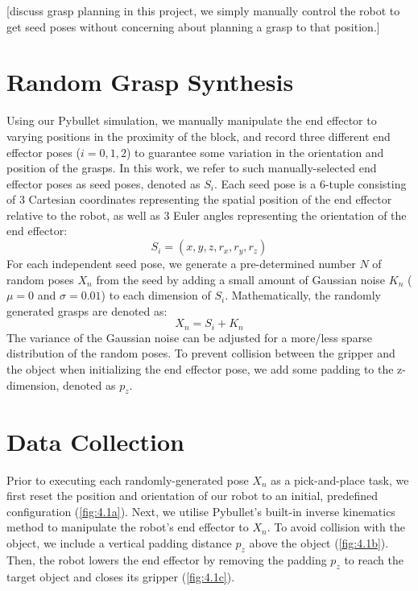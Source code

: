 \documentclass[11pt, a4paper]{report}
\theoremstyle{definition}
\begin{document}
[discuss grasp planning in this project, we simply manually control the robot to get seed poses without
concerning about planning a grasp to that position.]

\section{Random Grasp Synthesis}
\label{sec:4.1}
Using our Pybullet simulation, we manually manipulate the end effector to varying positions in the proximity of the block, and record three different end effector poses ($i=0,1,2$) to guarantee some variation in the orientation and position of the grasps. In this work, we refer to such manually-selected end effector poses as seed poses, denoted as $S_i$. Each seed pose is a 6-tuple consisting of 3 Cartesian coordinates representing the spatial position of the end effector relative to the robot, as well as 3 Euler angles representing the orientation of the end effector:
\begin{equation}
    S_i=(x,y,z,r_x,r_y,r_z)
\end{equation}
For each independent seed pose, we generate a pre-determined number $N$ of random poses $X_n$ from the seed by adding a small amount of Gaussian noise $K_n$ ($\mu=0$ and $\sigma=0.01$) to each dimension of $S_i$. Mathematically, the randomly generated grasps are denoted as:
\begin{equation}
    X_n=S_i+K_n
\end{equation}
The variance of the Gaussian noise can be adjusted for a more/less sparse distribution of the random poses. To prevent collision between the gripper and the object when initializing the end effector pose, we add some padding to the z-dimension, denoted as $p_z$.


\section{Data Collection}
\label{sec:4.2}
Prior to executing each randomly-generated pose $X_n$ as a pick-and-place task, we first reset the position and orientation of our robot to an initial, predefined configuration (\ref{fig:4.1a}). Next, we utilise Pybullet's built-in inverse kinematics method to manipulate the robot's end effector to $X_n$. To avoid collision with the object, we include a vertical padding distance $p_z$ above the object (\ref{fig:4.1b}). Then, the robot lowers the end effector by removing the padding $p_z$ to reach the target object and closes its gripper (\ref{fig:4.1c}).
\end{document}
